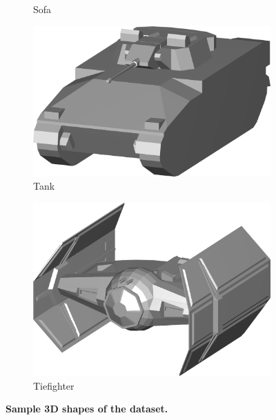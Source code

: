 \begin{figure}
\begin{subfigure}[t]{0.19\linewidth}
		\caption{Sofa} 	
	\end{subfigure}
	\begin{subfigure}[t]{0.19\linewidth} \centering
		\includegraphics[width=1\linewidth]{./fig/eval/24tank.png}  
		\caption{Tank} 	
	\end{subfigure} 
	\begin{subfigure}[t]{0.19\linewidth} \centering
		\includegraphics[width=1\linewidth]{./fig/eval/25tiefighter.png}  
		\caption{Tiefighter} 	
	\end{subfigure} 
	\caption{\textbf{Sample 3D shapes of the \meshset dataset.}}
	\label{fig/eval/sampleshapes}
\end{figure}
